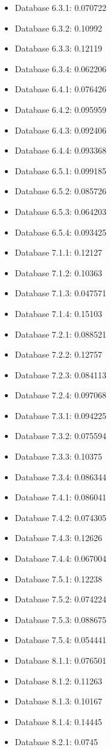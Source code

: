 \begin{itemize}
\item Database 6.3.1: 0.070722
\item Database 6.3.2: 0.10992
\item Database 6.3.3: 0.12119
\item Database 6.3.4: 0.062206
\item Database 6.4.1: 0.076426
\item Database 6.4.2: 0.095959
\item Database 6.4.3: 0.092406
\item Database 6.4.4: 0.093368
\item Database 6.5.1: 0.099185
\item Database 6.5.2: 0.085726
\item Database 6.5.3: 0.064203
\item Database 6.5.4: 0.093425
\item Database 7.1.1: 0.12127
\item Database 7.1.2: 0.10363
\item Database 7.1.3: 0.047571
\item Database 7.1.4: 0.15103
\item Database 7.2.1: 0.088521
\item Database 7.2.2: 0.12757
\item Database 7.2.3: 0.084113
\item Database 7.2.4: 0.097068
\item Database 7.3.1: 0.094225
\item Database 7.3.2: 0.075594
\item Database 7.3.3: 0.10375
\item Database 7.3.4: 0.086344
\item Database 7.4.1: 0.086041
\item Database 7.4.2: 0.074305
\item Database 7.4.3: 0.12626
\item Database 7.4.4: 0.067004
\item Database 7.5.1: 0.12238
\item Database 7.5.2: 0.074224
\item Database 7.5.3: 0.088675
\item Database 7.5.4: 0.054441
\item Database 8.1.1: 0.076501
\item Database 8.1.2: 0.11263
\item Database 8.1.3: 0.10167
\item Database 8.1.4: 0.14445
\item Database 8.2.1: 0.0745

\end{itemize}
